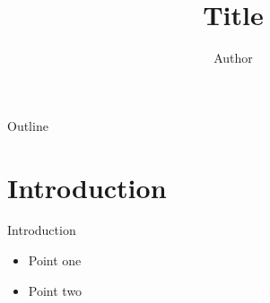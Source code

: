 \documentclass{beamer}
\title{Title}
\author{Author}
\date{}
\begin{document}
\frame{\titlepage}

\begin{frame}{Outline}
\tableofcontents
\end{frame}

\section{Introduction}
\begin{frame}{Introduction}
\begin{itemize}
  \item Point one
  \item Point two
\end{itemize}
\end{frame}
\end{document}
